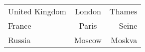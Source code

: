 \documentclass[12pt]{article}
\begin{document}
\setlength{\extrarowheight}{2mm}
\setlength{\tabcolsep}{2mm}

\setlength{\arrayrulewidth}{2pt}
\begin{tabular}{|l|c|r|}
\arrayrulecolor{black}\hline
United Kingdom & London & Thames\\
\arrayrulecolor{blue}\hline
France & Paris & Seine \\
\arrayrulecolor{black}\cline{1-1}
\arrayrulecolor{red}\cline{2-3}
Russia & Moscow & Moskva \\ \hline
\end{tabular}
\end{document}
